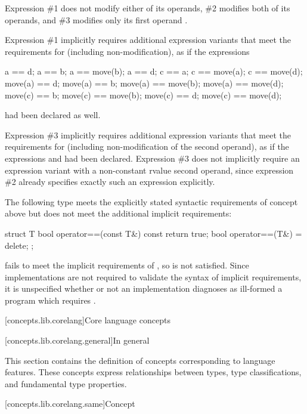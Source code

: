 Expression \#1 does not modify either of its operands, \#2 modifies both of its
operands, and \#3 modifies only its first operand .

Expression \#1 implicitly requires additional expression variants that meet the
requirements for  (including non-modification), as if the expressions
\begin{codeblock}
a == d;       a == b;             a == move(b);       a == d;
c == a;       c == move(a);       c == move(d);
move(a) == d; move(a) == b;       move(a) == move(b); move(a) == move(d);
move(c) == b; move(c) == move(b); move(c) == d;       move(c) == move(d);
\end{codeblock}
had been declared as well.

Expression \#3 implicitly requires additional expression variants that meet the
requirements for  (including non-modification of the second operand),
as if the expressions  and  had been declared.
Expression \#3 does not implicitly require an expression variant with a
non-constant rvalue second operand, since expression \#2 already specifies exactly
such an expression explicitly.
\exitexample

\enterexample
The following type  meets the explicitly stated syntactic requirements
of concept  above but does not meet the additional implicit requirements:

\begin{codeblock}
struct T {
  bool operator==(const T&) const { return true; }
  bool operator==(T&) = delete;
};
\end{codeblock}

 fails to meet the implicit
requirements of , so  is not satisfied. Since
implementations are not required to validate the syntax of implicit requirements, it
is unspecified whether or not an implementation diagnoses as ill-formed a program
which requires .
\exitexample

[concepts.lib.corelang]{Core language concepts}

[concepts.lib.corelang.general]{In general}

\pnum
This section contains the definition of concepts corresponding to language features.
These concepts express relationships between types, type classifications, and
fundamental type properties.

[concepts.lib.corelang.same]{Concept }

